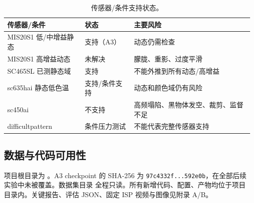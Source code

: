 \documentclass[11pt,a4paper,UTF8,fontset=fandol]{ctexart}
\begin{document}
\begin{table}[H]
\centering
\small
\caption{传感器/条件支持状态。}
\label{tab:sensor}
\begin{tabular}{p{}p{}p{}}
\toprule
传感器/条件 & 状态 & 主要风险 \\
\midrule
MIS20S1 低/中增益静态 & 支持（A3） & 动态仍需检查 \\
MIS20S1 高增益动态 & 未解决 & 朦胧、重影、过度平滑 \\
SC465SL 已测静态域 & 支持 & 不能外推到所有动态/高增益 \\
sc635hai 静态低色温 & 支持/条件支持 & 动态和颜色域仍有风险 \\
sc450ai & 不支持 & 高频塌陷、黑物体发空、裁剪、监督不足 \\
difficultpattern & 条件压力测试 & 不能代表完整传感器支持 \\
\bottomrule
\end{tabular}
\end{table}

\subsection*{数据与代码可用性}

项目根目录为 。A3 checkpoint 的 SHA-256 为 \texttt{97c4332f...592e0b}，在全部后续实验中未被覆盖。数据集目录  全程只读。所有新增代码、配置、产物均位于项目目录内。关键报告、评估 JSON、固定 ISP 视频与图像见附录 A/B。
\end{document}
